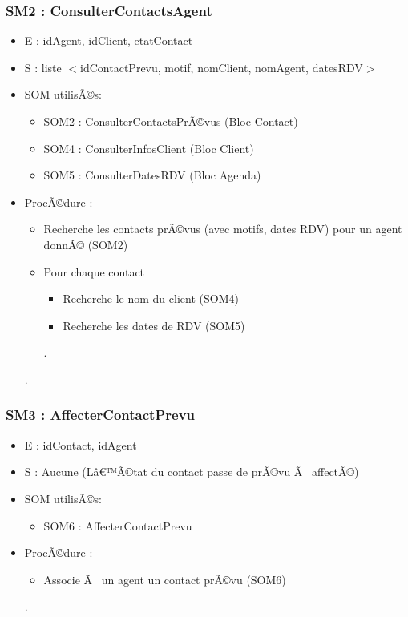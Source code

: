 \subsubsection{SM2 : ConsulterContactsAgent}
\begin{itemize}
\item E : idAgent, idClient, etatContact 
\item S : liste  $<$idContactPrevu, motif, nomClient, nomAgent, datesRDV$>$
\item SOM utilisÃ©s: 	
\begin{itemize}		
\item SOM2 : ConsulterContactsPrÃ©vus (Bloc Contact)
\item SOM4 : ConsulterInfosClient (Bloc Client)
\item SOM5 : ConsulterDatesRDV (Bloc Agenda)
\end{itemize}		
\item ProcÃ©dure : 	
\begin{itemize}		
\item Recherche les contacts prÃ©vus (avec motifs, dates RDV) pour un agent donnÃ© (SOM2)
\item Pour chaque contact
\begin{itemize}
\item Recherche le nom du client (SOM4)
\item Recherche les dates de RDV (SOM5)
\end{itemize}.
\end{itemize}.
\end{itemize}
\subsubsection{SM3 : AffecterContactPrevu}
\begin{itemize}
\item E : idContact, idAgent 	
\item S : Aucune (Lâ€™Ã©tat du contact passe de prÃ©vu Ã  affectÃ©)
\item SOM utilisÃ©s: 	
\begin{itemize}		
\item SOM6 : AffecterContactPrevu	
\end{itemize}		
\item ProcÃ©dure : 	
\begin{itemize}		
\item Associe Ã  un agent un contact prÃ©vu (SOM6)
\end{itemize}.
\end{itemize}
